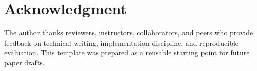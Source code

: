 \section*{Acknowledgment}

The author thanks reviewers, instructors, collaborators, and peers who provide feedback on technical writing, implementation discipline, and reproducible evaluation. This template was prepared as a reusable starting point for future paper drafts.
